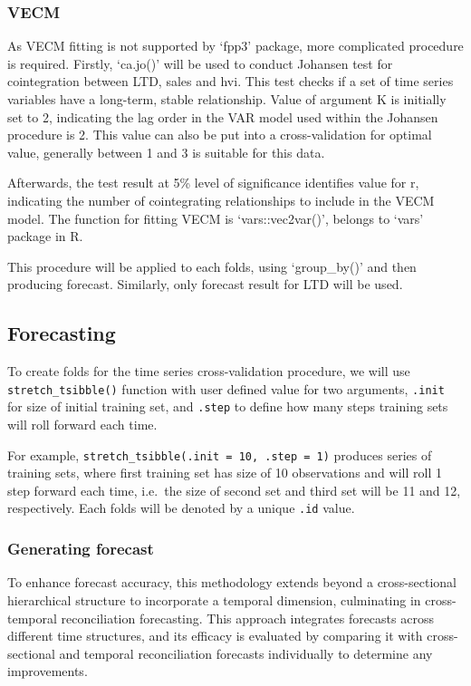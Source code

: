 \documentclass[11pt,a4paper,]{article}
\begin{document}
\subsubsection{VECM}\label{vecm}

As VECM fitting is not supported by `fpp3' package, more complicated procedure is required. Firstly, `ca.jo()' will be used to conduct Johansen test for cointegration between LTD, sales and hvi. This test checks if a set of time series variables have a long-term, stable relationship. Value of argument K is initially set to 2, indicating the lag order in the VAR model used within the Johansen procedure is 2. This value can also be put into a cross-validation for optimal value, generally between 1 and 3 is suitable for this data.

Afterwards, the test result at 5\% level of significance identifies value for r, indicating the number of cointegrating relationships to include in the VECM model. The function for fitting VECM is `vars::vec2var()', belongs to `vars' package in R.

This procedure will be applied to each folds, using `group\_by()' and then producing forecast. Similarly, only forecast result for LTD will be used.

\subsection{Forecasting}\label{forecasting}

To create folds for the time series cross-validation procedure, we will use \texttt{stretch\_tsibble()} function with user defined value for two arguments, \texttt{.init} for size of initial training set, and \texttt{.step} to define how many steps training sets will roll forward each time.

For example, \texttt{stretch\_tsibble(.init\ =\ 10,\ .step\ =\ 1)} produces series of training sets, where first training set has size of 10 observations and will roll 1 step forward each time, i.e.~the size of second set and third set will be 11 and 12, respectively. Each folds will be denoted by a unique \texttt{.id} value.

\subsubsection{Generating forecast}\label{generating-forecast}

To enhance forecast accuracy, this methodology extends beyond a cross-sectional hierarchical structure to incorporate a temporal dimension, culminating in cross-temporal reconciliation forecasting. This approach integrates forecasts across different time structures, and its efficacy is evaluated by comparing it with cross-sectional and temporal reconciliation forecasts individually to determine any improvements.
\end{document}

